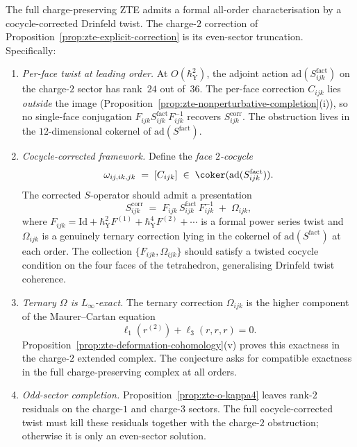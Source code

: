 \begin{conjecture}
\label{conj:zte-drinfeld-twist-completion}
\ClaimStatusConjectured
The full charge-preserving ZTE admits a formal all-order characterisation by a cocycle-corrected Drinfeld twist. The charge-$2$ correction of Proposition~\ref{prop:zte-explicit-correction} is its even-sector truncation. Specifically:
\begin{enumerate}[label=\textup{(\roman*)}]
 \item \emph{Per-face twist at leading order.} At $O(\hbar_{\mathrm{Y}}^2)$, the adjoint action $\mathrm{ad}(S^{\mathrm{fact}}_{ijk})$ on the charge-$2$ sector has rank~$24$ out of~$36$. The per-face correction $C_{ijk}$ lies \emph{outside} the image (Proposition~\ref{prop:zte-nonperturbative-completion}(i)), so no single-face conjugation $F_{ijk} S^{\mathrm{fact}}_{ijk} F_{ijk}^{-1}$ recovers $S^{\mathrm{corr}}_{ijk}$. The obstruction lives in the $12$-dimensional cokernel of $\mathrm{ad}(S^{\mathrm{fact}})$.

 \item \emph{Cocycle-corrected framework.} Define the \emph{face $2$-cocycle}
 \[
 \omega_{ij,ik,jk} \;=\; [C_{ijk}] \;\in\; \coker(\mathrm{ad}(S^{\mathrm{fact}}_{ijk})).
 \]
The corrected $S$-operator should admit a presentation
 \[
 S^{\mathrm{corr}}_{ijk} \;=\; F_{ijk}\, S^{\mathrm{fact}}_{ijk}\, F_{ijk}^{-1} \;+\; \Omega_{ijk},
 \]
 where $F_{ijk} = \mathrm{Id} + \hbar_{\mathrm{Y}}^2 F^{(1)} + \hbar_{\mathrm{Y}}^4 F^{(2)} + \cdots$ is a formal power series twist and $\Omega_{ijk}$ is a genuinely ternary correction lying in the cokernel of $\mathrm{ad}(S^{\mathrm{fact}})$ at each order. The collection $\{F_{ijk}, \Omega_{ijk}\}$ should satisfy a twisted cocycle condition on the four faces of the tetrahedron, generalising Drinfeld twist coherence.

 \item \emph{Ternary $\Omega$ is $L_\infty$-exact.} The ternary correction $\Omega_{ijk}$ is the higher component of the Maurer--Cartan equation
 \[
 \ell_1(r^{(2)})+\ell_3(r,r,r)=0.
 \]
Proposition~\ref{prop:zte-deformation-cohomology}(v) proves this exactness in the charge-$2$ extended complex. The conjecture asks for compatible exactness in the full charge-preserving complex at all orders.

 \item \emph{Odd-sector completion.} Proposition~\ref{prop:zte-o-kappa4} leaves rank-$2$ residuals on the charge-$1$ and charge-$3$ sectors. The full cocycle-corrected twist must kill these residuals together with the charge-$2$ obstruction; otherwise it is only an even-sector solution.
\end{enumerate}
\end{conjecture}

